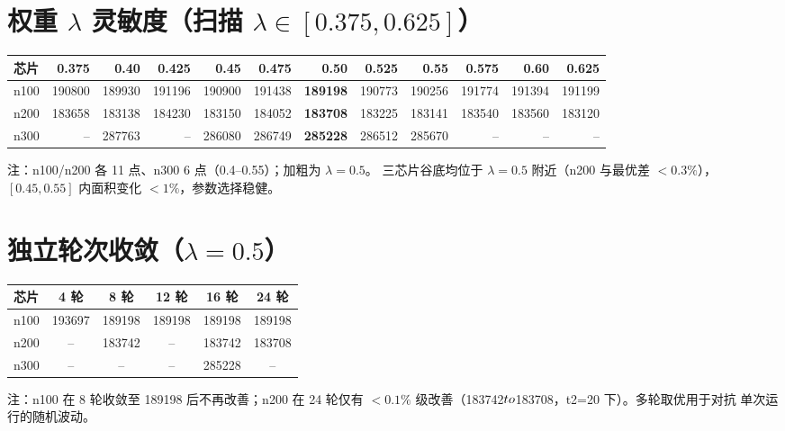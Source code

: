 \documentclass[12pt,a4paper]{article}
\begin{document}
\section{权重 $\lambda$ 灵敏度（扫描 $\lambda\in[0.375,0.625]$）}

\begin{table}[H]
\centering
\scriptsize
\setlength{\tabcolsep}{2.5pt}
\begin{tabular}{lrrrrrrrrrrr}
\toprule
芯片 & 0.375 & 0.40 & 0.425 & 0.45 & 0.475 & 0.50 & 0.525 & 0.55 & 0.575 & 0.60 & 0.625 \\
\midrule

n100 & 190800 & 189930 & 191196 & 190900 & 191438 & \textbf{189198} & 190773 & 190256 & 191774 & 191394 & 191199 \\
n200 & 183658 & 183138 & 184230 & 183150 & 184052 & \textbf{183708} & 183225 & 183141 & 183540 & 183560 & 183120 \\
n300 & -- & 287763 & -- & 286080 & 286749 & \textbf{285228} & 286512 & 285670 & -- & -- & -- \\
\bottomrule
\end{tabular}
\end{table}

注：n100/n200 各 11 点、n300 6 点（0.4--0.55）；加粗为 $\lambda=0.5$。
三芯片谷底均位于 $\lambda=0.5$ 附近（n200 与最优差 $<0.3\%$），
$[0.45, 0.55]$ 内面积变化 $<1\%$，参数选择稳健。

\section{独立轮次收敛（$\lambda=0.5$）}

\begin{table}[H]
\centering
\scriptsize
\setlength{\tabcolsep}{3pt}
\begin{tabular}{lccccc}
\toprule
芯片 & 4 轮 & 8 轮 & 12 轮 & 16 轮 & 24 轮 \\
\midrule

n100 & 193697 & 189198 & 189198 & 189198 & 189198 \\
n200 & -- & 183742 & -- & 183742 & 183708 \\
n300 & -- & -- & -- & 285228 & -- \\
\bottomrule
\end{tabular}
\end{table}

注：n100 在 8 轮收敛至 189198 后不再改善；n200 在 24 轮仅有
$<0.1\%$ 级改善（183742$\\to$183708，t2=20 下）。多轮取优用于对抗
单次运行的随机波动。
\end{document}

